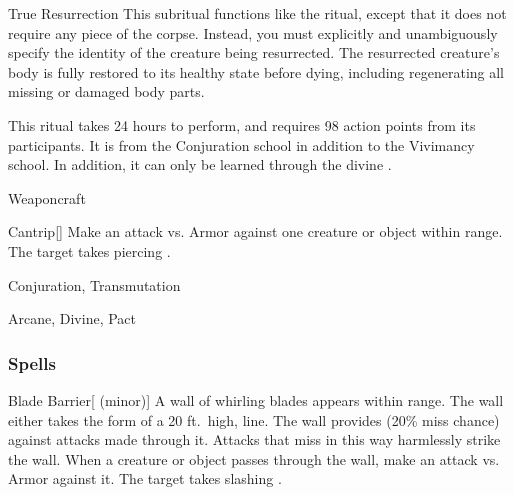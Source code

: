 \begin{ability}[\nth{7}]{True Resurrection}
This subritual functions like the  ritual, except that it does not require any piece of the corpse.
Instead, you must explicitly and unambiguously specify the identity of the creature being resurrected.
The resurrected creature's body is fully restored to its healthy state before dying, including regenerating all missing or damaged body parts.

This ritual takes 24 hours to perform, and requires 98 action points from its participants.
It is from the Conjuration school in addition to the Vivimancy school.
In addition, it can only be learned through the divine .
\end{ability}
\vspace{0.25em}


\newpage
\begin{spellsection}{Weaponcraft}

\begin{spellheader}
\end{spellheader}


\begin{ability}{Cantrip}[]
Make an attack vs. Armor against one creature or object within \rngmed range.
\hit The target takes piercing .
\end{ability}




 Conjuration, Transmutation

 Arcane, Divine, Pact
\end{spellsection}


\subsubsection{Spells}


\begin{ability}[\nth{1}]{Blade Barrier}[ (minor)]
A wall of whirling blades appears within \rngmed range.
The wall either takes the form of a 20 ft.\ high, \arealarge line.
The wall provides  (20\% miss chance) against attacks made through it.
Attacks that miss in this way harmlessly strike the wall.
When a creature or object passes through the wall, make an attack vs. Armor against it.
\hit The target takes slashing .
\end{ability}
\vspace{0.25em}



